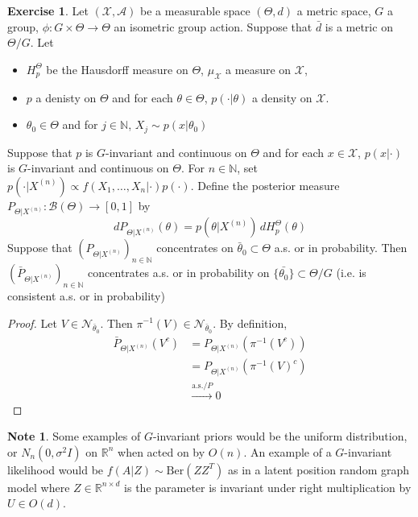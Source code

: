 \documentclass[12pt]{amsart}
\theoremstyle{definition}
\newtheorem{note}[definition]{Note}
\newtheorem{ex}[definition]{Exercise}
\newcommand{\sig}{\sigma}
\newcommand{\N}{\mathbb{N}}
\newcommand{\R}{\mathbb{R}}
\newcommand{\MA}{\mathcal{A}}
\newcommand{\MB}{\mathcal{B}}
\newcommand{\MN}{\mathcal{N}}
\newcommand{\MX}{\mathcal{X}}
\newcommand{\convt}[1]{\xrightarrow{\text{#1}}}
\begin{document}
	\begin{ex}
	Let $(\MX, \MA)$ be a measurable space $(\Theta, d)$ a metric space, $G$ a group, $\phi: G \times \Theta \rightarrow \Theta$ an isometric group action. Suppose that $\bar{d}$ is a metric on $\Theta / G$. Let 
	\begin{itemize}
	\item $H_p^{\Theta}$ be the Hausdorff measure on $\Theta$, $\mu_{\MX}$ a measure on $\MX$, 
	\item $p$ a denisty on $\Theta$ and for each $\theta \in \Theta$, $p(\cdot|\theta)$ a density on $\MX$. 
	\item $\theta_0 \in \Theta$ and for $j \in \N$, $X_j \sim p(x|\theta_0)$
	\end{itemize}
	Suppose that $p$ is $G$-invariant and continuous on $\Theta$ and for each $x \in \MX$, $p(x| \cdot)$ is $G$-invariant and continuous on $\Theta$. For $n \in \N$, set $p(\cdot|X^{(n)}) \propto f(X_1, \ldots, X_n| \cdot) p(\cdot)$. Define the posterior measure $P_{\Theta|X^{(n)}}: \MB(\Theta) \rightarrow [0, 1]$ by 
	\begin{equation*}
	d P_{\Theta|X^{(n)}} (\theta) = p(\theta |X^{(n)}) \, dH_p^{\Theta} (\theta)
	\end{equation*}
	Suppose that $(P_{\Theta|X^{(n)}})_{n \in \N}$ concentrates on $\bar{\theta}_0 \subset \Theta$ a.s. or in probability. Then $(\bar{P}_{\Theta|X^{(n)}})_{n \in \N}$ concentrates a.s. or in probability on $\{\bar{\theta_0}\} \subset \Theta / G$ (i.e. is consistent a.s. or in probability)
	\end{ex}
	
	\begin{proof}
	Let $V \in \MN_{\bar{\theta}_0}$. Then $\pi^{-1}(V) \in \MN_{\bar{\theta}_0}$. By definition, 
	\begin{align*}
	\bar{P}_{\Theta|X^{(n)}}(V^c)
	&= P_{\Theta|X^{(n)}}(\pi^{-1}(V^c)) \\
	&= P_{\Theta|X^{(n)}}(\pi^{-1}(V)^c) \\
	&\convt{a.s./$P$} 0 
	\end{align*}
	\end{proof}
	
	\begin{note}
	Some examples of $G$-invariant priors would be the uniform distribution, or $N_n(0, \sig^2I)$ on $\R^n$ when acted on by $O(n)$. An example of a $G$-invariant likelihood would be $f(A|Z) \sim \text{Ber}(ZZ^T)$ as in a latent position random graph model where $Z \in \R^{n \times d}$ is the parameter is invariant under right multiplication by $U \in O(d)$.
	\end{note}
	
\end{document}
